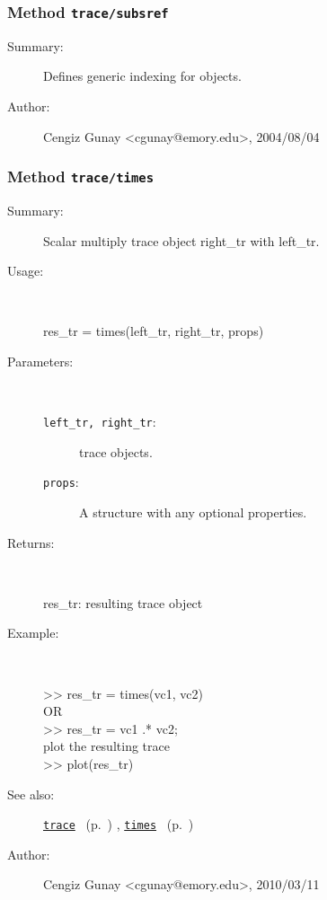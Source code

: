 \subsubsection[Method \texttt{subsref}]{Method \texttt{trace/subsref}}%
%
\label{ref_trace__subsref}%
\hypertarget{ref_trace__subsref}{}%
\begin{description}
\item[Summary:]Defines generic indexing for objects.
%
%
%
%
%
%
%
\item[Author:]%
Cengiz Gunay <cgunay@emory.edu>, 2004/08/04
%
\end{description}
\methodline%
\subsubsection[Method \texttt{times}]{Method \texttt{trace/times}}%
%
\label{ref_trace__times}%
\hypertarget{ref_trace__times}{}%
\begin{description}
\item[Summary:]Scalar multiply trace object right\_tr with left\_tr.
%
\item[Usage:]~%
\begin{lyxcode}%
res\_tr = times(left\_tr, right\_tr, props)
%
\end{lyxcode}%
%
%
\item[Parameters:]~
\begin{description}%
\item[\texttt{left\_tr, right\_tr}:]
 trace objects.
\item[\texttt{props}:]
 A structure with any optional properties.
\end{description}%
%
\item[Returns:
]~

   res\_tr: resulting trace object
%
\item[Example:]~
\begin{lyxcode} >> res\_tr = times(vc1, vc2)
\\%
 OR
\\%
 >> res\_tr = vc1 .* vc2;
\\%
 plot the resulting trace
\\%
 >> plot(res\_tr)
\\%
\end{lyxcode}
%
\item[See also:]%
\hyperlink{ref_trace}{\texttt{trace}}%
\ (p.~\pageref{ref_trace})%
%
, \hyperlink{ref_times}{\texttt{times}}%
\ (p.~\pageref{ref_times})%
%
%
\item[Author:]%
Cengiz Gunay <cgunay@emory.edu>, 2010/03/11
%
\end{description}
\methodline%
